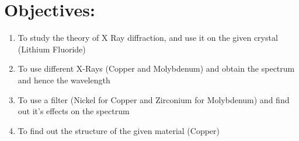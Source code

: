 \documentclass[]{report}[12 pt]
\begin{document}
	
	\section*{Objectives:}
	\begin{enumerate}
	\item To study the theory of X Ray diffraction, and use it on the given crystal (Lithium Fluoride)
	\item To use different X-Rays (Copper and Molybdenum) and obtain the spectrum and hence the wavelength
	\item To use a filter (Nickel for Copper and Zirconium for Molybdenum) and find out it's effects on the spectrum
	\item To find out the structure of the given material (Copper)
	\end{enumerate}
\end{document}
